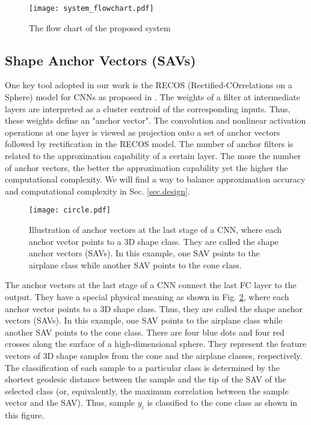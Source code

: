 \documentclass[preprint,12pt]{elsarticle}
\begin{document}
\begin{figure}[t]
\centering
\texttt{[image: system\_flowchart.pdf]}
\caption{The flow chart of the proposed system}\label{fig.flow_chart}
\end{figure}

\subsection{Shape Anchor Vectors (SAVs)} \label{subsec.RECOS}

One key tool adopted in our work is the RECOS (Rectified-COrrelations on
a Sphere) model for CNNs as proposed in \cite{CCKuo}.  The weights of a
filter at intermediate layers are interpreted as a cluster centroid of
the corresponding inputs. Thus, these weights define an "anchor
vector".  The convolution and nonlinear activation operations at one
layer is viewed as projection onto a set of anchor vectors followed by
rectification in the RECOS model. The number of anchor filters is
related to the approximation capability of a certain layer. The more the
number of anchor vectors, the better the approximation capability yet
the higher the computational complexity. We will find a way to balance
approximation accuracy and computational complexity in Sec.
\ref{sec.design}. 

\begin{figure}[t]
\centering
\texttt{[image: circle.pdf]}
\caption{Illustration of anchor vectors at the last stage of a CNN,
where each anchor vector points to a 3D shape class. They are called
the shape anchor vectors (SAVs). In this example, one SAV points to the
airplane class while another SAV points to the cone class.}\label{fig.circle}
\end{figure}

The anchor vectors at the last stage of a CNN connect the last FC layer
to the output. They have a special physical meaning as shown in Fig.
\ref{fig.circle}, where each anchor vector points to a 3D shape class.
Thus, they are called the shape anchor vectors (SAVs). In this example,
one SAV points to the airplane class while another SAV points to the
cone class.  There are four blue dots and four red crosses along the
surface of a high-dimensional sphere. They represent the feature vectors
of 3D shape samples from the cone and the airplane classes,
respectively. The classification of each sample to a particular class is
determined by the shortest geodesic distance between the sample and the
tip of the SAV of the selected class (or, equivalently, the maximum
correlation between the sample vector and the SAV). Thus, sample $y_i$
is classified to the cone class as shown in this figure. 
\end{document}
